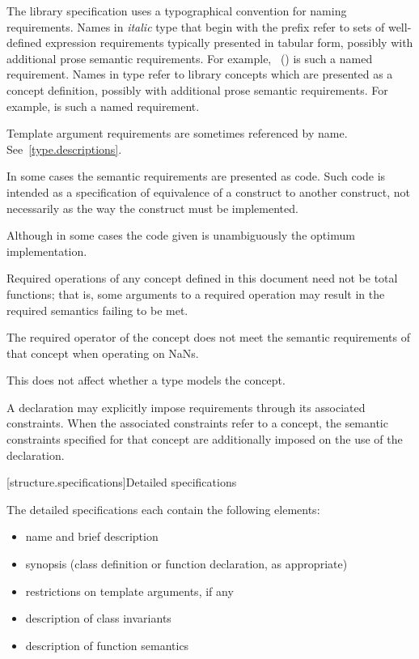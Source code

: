 \pnum
The library specification uses a typographical convention for naming
requirements. Names in \textit{italic} type that begin with the prefix
\oldconcept{} refer to sets of well-defined expression requirements typically
presented in tabular form, possibly with additional prose semantic requirements.
For example, ~() is such a named
requirement. Names in  type refer to library concepts
which are presented as a concept definition, possibly with additional
prose semantic requirements. For example,
is such a named requirement.

\pnum
Template argument requirements are sometimes referenced by name.
See~\ref{type.descriptions}.

\pnum
In some cases the semantic requirements are presented as \Cpp{} code.
Such code is intended as a
specification of equivalence of a construct to another construct, not
necessarily as the way the construct
must be implemented.
\begin{footnote}
Although in some cases the code given is
unambiguously the optimum implementation.
\end{footnote}

\pnum
Required operations of any concept defined in this document need not be
total functions; that is, some arguments to a required operation may
result in the required semantics failing to be met.
\begin{example}
The required \tcode{<} operator of the 
concept does not meet the
semantic requirements of that concept when operating on NaNs.
\end{example}
This does not affect whether a type models the concept.

\pnum
A declaration may explicitly impose requirements through its associated
constraints. When the associated constraints refer to a
concept, the semantic constraints specified for that concept
are additionally imposed on the use of the declaration.

[structure.specifications]{Detailed specifications}

\pnum
The detailed specifications each contain the following elements:%

\begin{itemize}
\item name and brief description
\item synopsis (class definition or function declaration, as appropriate)
\item restrictions on template arguments, if any
\item description of class invariants
\item description of function semantics
\end{itemize}

